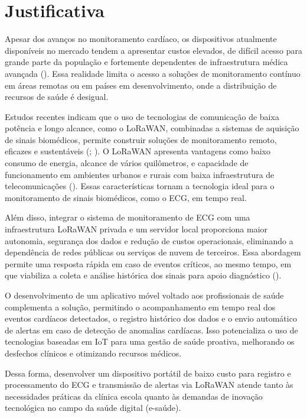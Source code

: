 \section{Justificativa}

\label{sec:motivacao}

Apesar dos avanços no monitoramento cardíaco, os dispositivos atualmente disponíveis no mercado tendem a apresentar custos elevados, de difícil acesso para grande parte da população e fortemente dependentes de infraestrutura médica avançada (). Essa realidade limita o acesso a soluções de monitoramento contínuo em áreas remotas ou em países em desenvolvimento, onde a distribuição de recursos de saúde é desigual.

Estudos recentes indicam que o uso de tecnologias de comunicação de baixa potência e longo alcance, como o LoRaWAN, combinadas a sistemas de aquisição de sinais biomédicos, permite construir soluções de monitoramento remoto, eficazes e sustentáveis (; ). O LoRaWAN apresenta vantagens como baixo consumo de energia, alcance de vários quilômetros, e capacidade de funcionamento em ambientes urbanos e rurais com baixa infraestrutura de telecomunicações (). Essas características tornam a tecnologia ideal para o monitoramento de sinais biomédicos, como o ECG, em tempo real.

Além disso, integrar o sistema de monitoramento de ECG com uma infraestrutura LoRaWAN privada e um servidor local proporciona maior autonomia, segurança dos dados e redução de custos operacionais, eliminando a dependência de redes públicas ou serviços de nuvem de terceiros. Essa abordagem permite uma resposta rápida em caso de eventos críticos, ao mesmo tempo, em que viabiliza a coleta e análise histórica dos sinais para apoio diagnóstico ().

O desenvolvimento de um aplicativo móvel voltado aos profissionais de saúde complementa a solução, permitindo o acompanhamento em tempo real dos eventos cardíacos detectados, o registro histórico dos dados e o envio automático de alertas em caso de detecção de anomalias cardíacas. Isso potencializa o uso de tecnologias baseadas em \acs{IoT} para uma gestão de saúde proativa, melhorando os desfechos clínicos e otimizando recursos médicos.

Dessa forma, desenvolver um dispositivo portátil de baixo custo para registro e processamento do ECG e transmissão de alertas via LoRaWAN atende tanto às necessidades práticas da clínica escola quanto às demandas de inovação tecnológica no campo da saúde digital (e-saúde).




